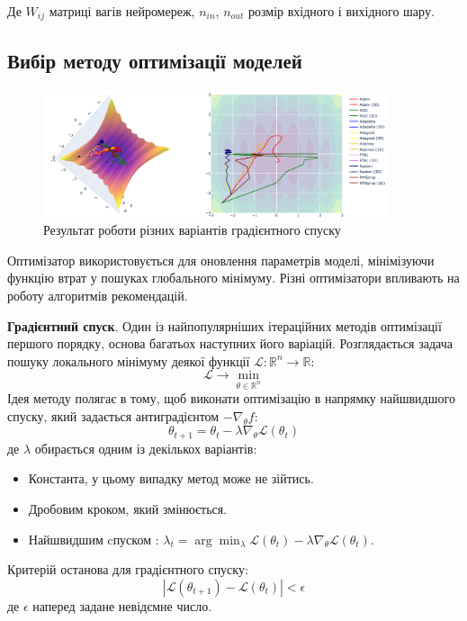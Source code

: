 Де $W_{ij}$  матриці вагів нейромереж, $n_{in}$, $n_{out}$ розмір вхідного і вихідного шару.

\subsection{Вибір методу оптимізації моделей}

\begin{figure}
    \centering
    \includegraphics[width=0.9\textwidth]{images/sgd.png}
    \caption{Результат роботи різних варіантів градієнтного спуску}
\end{figure}

Оптимізатор використовується для оновлення параметрів моделі, мінімізуючи функцію втрат у пошуках глобального мінімуму. Різні оптимізатори впливають на роботу алгоритмів рекомендацій.

\textbf{Градієнтний спуск}.
Один із найпопулярніших ітераційних методів оптимізації першого порядку, основа багатьох наступних його варіацій. Розглядається задача пошуку локального мінімуму деякої функції $\mathcal{L}: \mathbb{R}^{n} \rightarrow \mathbb{R}$:
\[\mathcal{L} \rightarrow \min_{\theta \in \mathbb{R}^{n}}  \]
Ідея методу полягає в тому, щоб виконати оптимізацію в напрямку найшвидшого спуску, який задається антиградієнтом  $-\nabla_{\theta} f$:
\[\theta_{t+1} = \theta_{t} - \lambda  \nabla_{\theta} \mathcal{L}(\theta_t) \]
де $\lambda$ обирається одним із декількох варіантів:
\begin{itemize}
    \item Константа, у цьому випадку метод може не зійтись.
    \item Дробовим кроком, який змінюється.
    \item Найшвидшим cпуском : $\lambda_t = \arg \min_{\lambda} \mathcal{L} (\theta_t) - \lambda \nabla_{\theta} \mathcal{L}(\theta_t) $.
\end{itemize} 
Критерій останова для градієнтного спуску:
\[|\mathcal{L}(\theta_{t+1}) -  \mathcal{L}(\theta_t)| < \epsilon\]
де $\epsilon$ наперед задане невідємне число.

